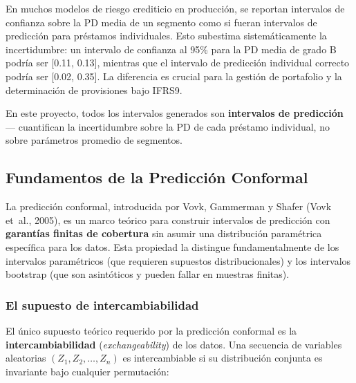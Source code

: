 \documentclass[
  spanish,
  11pt,
  letterpaper,
]{scrbook}
\theoremstyle{plain}
\theoremstyle{remark}
\begin{document}
\begin{tcolorbox}[enhanced jigsaw, arc=.35mm, bottomrule=.15mm, bottomtitle=1mm, breakable, colback=white, colbacktitle=quarto-callout-warning-color!10!white, colframe=quarto-callout-warning-color-frame, coltitle=black, left=2mm, leftrule=.75mm, opacityback=0, opacitybacktitle=0.6, rightrule=.15mm, title=\textcolor{quarto-callout-warning-color}{\faExclamationTriangle}\hspace{0.5em}{Error frecuente en la práctica bancaria}, titlerule=0mm, toprule=.15mm, toptitle=1mm]

En muchos modelos de riesgo crediticio en producción, se reportan
intervalos de confianza sobre la PD media de un segmento como si fueran
intervalos de predicción para préstamos individuales. Esto subestima
sistemáticamente la incertidumbre: un intervalo de confianza al 95\%
para la PD media de grado B podría ser {[}0.11, 0.13{]}, mientras que el
intervalo de predicción individual correcto podría ser {[}0.02, 0.35{]}.
La diferencia es crucial para la gestión de portafolio y la
determinación de provisiones bajo IFRS9.

\end{tcolorbox}

En este proyecto, todos los intervalos generados son \textbf{intervalos
de predicción} --- cuantifican la incertidumbre sobre la PD de cada
préstamo individual, no sobre parámetros promedio de segmentos.

\subsection{Fundamentos de la Predicción
Conformal}\label{sec-conformal-fundamentals}

La predicción conformal, introducida por Vovk, Gammerman y Shafer (Vovk
et~al., 2005), es un marco teórico para construir intervalos de
predicción con \textbf{garantías finitas de cobertura} sin asumir una
distribución paramétrica específica para los datos. Esta propiedad la
distingue fundamentalmente de los intervalos paramétricos (que requieren
supuestos distribucionales) y los intervalos bootstrap (que son
asintóticos y pueden fallar en muestras finitas).

\subsubsection{El supuesto de
intercambiabilidad}\label{sec-exchangeability}

El único supuesto teórico requerido por la predicción conformal es la
\textbf{intercambiabilidad} (\emph{exchangeability}) de los datos. Una
secuencia de variables aleatorias \((Z_1, Z_2, \ldots, Z_n)\) es
intercambiable si su distribución conjunta es invariante bajo cualquier
permutación:
\end{document}
